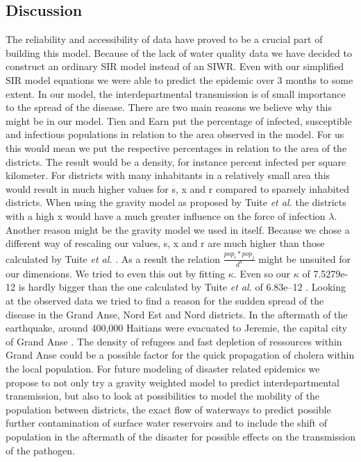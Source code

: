 \documentclass[11pt]{article}
\begin{document}
{\subsection{Discussion} 
The reliability and accessibility of data have proved to be a crucial part of building this model. Because of the lack of water quality data we have decided to construct an ordinary SIR model instead of an SIWR. Even with our simplified SIR model equations we were able to predict the epidemic over 3 months to some extent. In our model, the interdepartmental transmission is of small importance to the spread of the disease. There are two main reasons we believe why this might be in our model. Tien and Earn \cite{tien:2010} put the percentage of infected, susceptible and infectious populations in relation to the area observed in the model. For us this would mean we put the respective percentages in relation to the area of the districts. The result would be a density, for instance percent infected per square kilometer. For districts with many inhabitants in a relatively small area this would result in much higher values for s, x and r compared to sparsely inhabited districts. When using the gravity model as proposed by Tuite \textit{et al.} \cite{tuite:2011} the districts with a high x would have a much greater influence on the force of infection $\lambda$.\\
Another reason might be the gravity model we used in itself. Because we chose a different way of rescaling our values, s, x and r are much higher than those calculated by Tuite \textit{et al.} \cite{tuite:2011}. As a result the relation $\frac{pop_{i}*pop_{j}}{d^{n}}$ might be unsuited for our dimensions. We tried to even this out by fitting $\kappa$. Even so our $\kappa$ of 7.5279e-12 is hardly bigger than the one calculated by Tuite \textit{et al.} of 6.83e–12 \cite{tuite:2011}. Looking at the observed data we tried to find a reason for the sudden spread of the disease in the Grand Anse, Nord Est and Nord districts. In the aftermath of the earthquake, around 400,000 Haitians were evacuated to Jeremie, the capital city of Grand Anse \cite{web:appo}. The density of refugees and fast depletion of ressources within Grand Anse could be a possible factor for the quick propagation of cholera within the local population. For future modeling of disaster related epidemics we propose to not only try a gravity weighted model to predict interdepartmental transmission, but also to look at possibilities to model the mobility of the population between districts, the exact flow of waterways to predict possible further contamination of surface water reservoirs and to include the shift of population in the aftermath of the disaster for possible effects on the transmission of the pathogen.









}
\end{document}
